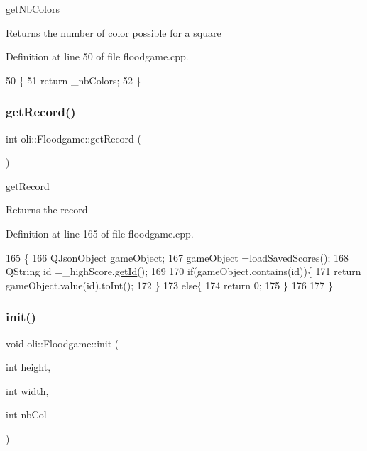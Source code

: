 get\+Nb\+Colors 

\begin{DoxyReturn}{Returns}
the number of color possible for a square 
\end{DoxyReturn}


Definition at line 50 of file floodgame.\+cpp.


\begin{DoxyCode}
50                           \{
51     \textcolor{keywordflow}{return} \_nbColors;
52 \}
\end{DoxyCode}
\hypertarget{classoli_1_1_floodgame_af0084c4fecf2b51da6aed1f73de05e9e}{}\label{classoli_1_1_floodgame_af0084c4fecf2b51da6aed1f73de05e9e} 
\subsubsection{\texorpdfstring{get\+Record()}{getRecord()}}
{\footnotesize\ttfamily int oli\+::\+Floodgame\+::get\+Record (\begin{DoxyParamCaption}{ }\end{DoxyParamCaption})}



get\+Record 

\begin{DoxyReturn}{Returns}
the record 
\end{DoxyReturn}


Definition at line 165 of file floodgame.\+cpp.


\begin{DoxyCode}
165                         \{
166     QJsonObject gameObject;
167     gameObject =loadSavedScores();
168     QString \textcolor{keywordtype}{id} =\_highScore.\hyperlink{classoli_1_1_high_score_ae0c11fdb5f35199aa785d6e66bfe8d03}{getId}();
169 
170     \textcolor{keywordflow}{if}(gameObject.contains(\textcolor{keywordtype}{id}))\{
171         \textcolor{keywordflow}{return} gameObject.value(\textcolor{keywordtype}{id}).toInt();
172     \}
173     \textcolor{keywordflow}{else}\{
174         \textcolor{keywordflow}{return} 0;
175     \}
176 
177 \}
\end{DoxyCode}
\hypertarget{classoli_1_1_floodgame_a2f1bf35c7c7077bccf8576324ccf60ed}{}\label{classoli_1_1_floodgame_a2f1bf35c7c7077bccf8576324ccf60ed} 
\subsubsection{\texorpdfstring{init()}{init()}}
{\footnotesize\ttfamily void oli\+::\+Floodgame\+::init (\begin{DoxyParamCaption}\item[{int}]{height,  }\item[{int}]{width,  }\item[{int}]{nb\+Col }\end{DoxyParamCaption})}



